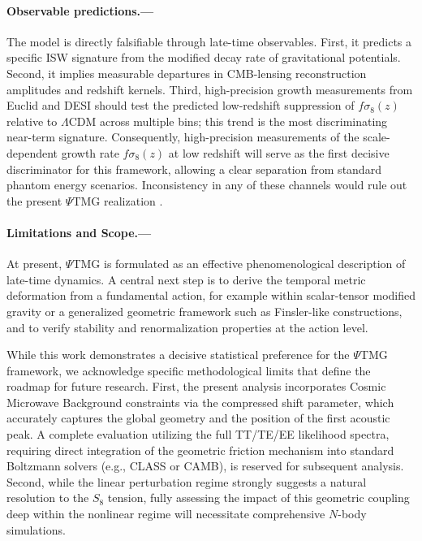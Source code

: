 \documentclass[10pt,twocolumn,secnumarabic,amssymb, nobibnotes, aps, prd, floatfix]{revtex4-2}
\begin{document}
\paragraph*{\textbf{Observable predictions.---}}
The model is directly falsifiable through late-time observables. First, it predicts a specific ISW signature from the modified decay rate of gravitational potentials. Second, it implies measurable departures in CMB-lensing reconstruction amplitudes and redshift kernels. Third, high-precision growth measurements from Euclid and DESI should test the predicted low-redshift suppression of $f\sigma_8(z)$ relative to $\Lambda$CDM across multiple bins; this trend is the most discriminating near-term signature. Consequently, high-precision measurements of the scale-dependent growth rate $f\sigma_8(z)$ at low redshift will serve as the first decisive discriminator for this framework, allowing a clear separation from standard phantom energy scenarios. Inconsistency in any of these channels would rule out the present $\Psi$TMG realization \cite{JWST2023CEERS}.

\paragraph*{\textbf{Limitations and Scope.---}}
At present, $\Psi$TMG is formulated as an effective phenomenological description of late-time dynamics. A central next step is to derive the temporal metric deformation from a fundamental action, for example within scalar-tensor modified gravity or a generalized geometric framework such as Finsler-like constructions, and to verify stability and renormalization properties at the action level.

While this work demonstrates a decisive statistical preference for the $\Psi$TMG framework, we acknowledge specific methodological limits that define the roadmap for future research. First, the present analysis incorporates Cosmic Microwave Background constraints via the compressed shift parameter, which accurately captures the global geometry and the position of the first acoustic peak. A complete evaluation utilizing the full TT/TE/EE likelihood spectra, requiring direct integration of the geometric friction mechanism into standard Boltzmann solvers (e.g., CLASS or CAMB), is reserved for subsequent analysis. Second, while the linear perturbation regime strongly suggests a natural resolution to the $S_8$ tension, fully assessing the impact of this geometric coupling deep within the nonlinear regime will necessitate comprehensive $N$-body simulations.
\end{document}
